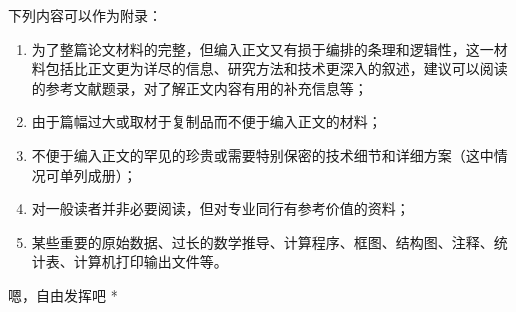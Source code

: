 \appendix

下列内容可以作为附录：

\begin{enumerate}[label=\arabic*)]
    \item 为了整篇论文材料的完整，但编入正文又有损于编排的条理和逻辑性，这一材料包括比正文更为详尽的信息、研究方法和技术更深入的叙述，建议可以阅读的参考文献题录，对了解正文内容有用的补充信息等；
    \item 由于篇幅过大或取材于复制品而不便于编入正文的材料；
    \item 不便于编入正文的罕见的珍贵或需要特别保密的技术细节和详细方案（这中情况可单列成册）；
    \item 对一般读者并非必要阅读，但对专业同行有参考价值的资料；
    \item 某些重要的原始数据、过长的数学推导、计算程序、框图、结构图、注释、统计表、计算机打印输出文件等。
\end{enumerate}

\par * 嗯，自由发挥吧 * \par